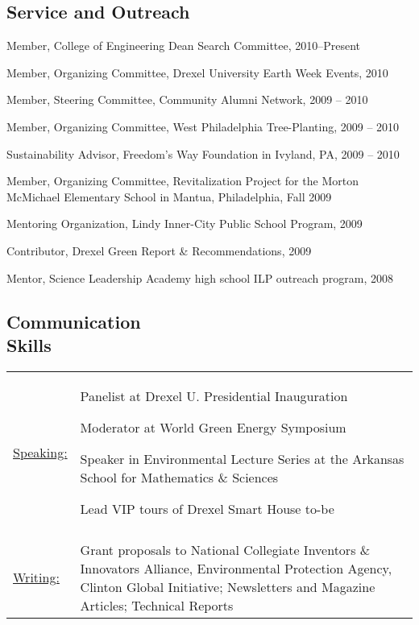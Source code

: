 \documentclass[margin]{res}
\begin{document}
\begin{resume}
\begin{educate}
\vspace{-3mm} \section{Service and Outreach}
	\begin{list}{}{\leftmargin=1em} \itemsep -2pt %
	\item Member, College of Engineering Dean Search Committee, 2010--Present
	\item Member, Organizing Committee, Drexel University Earth Week Events, 2010
	\item Member, Steering Committee, Community Alumni Network, 2009 -- 2010
	\item Member, Organizing Committee, West Philadelphia Tree-Planting, 2009 -- 2010
	\item Sustainability Advisor, Freedom's Way Foundation in Ivyland, PA, 2009 -- 2010
	\item Member, Organizing Committee, Revitalization Project for the Morton McMichael Elementary School in Mantua, Philadelphia, Fall 2009
	\item Mentoring Organization, Lindy Inner-City Public School Program, 2009
	\item Contributor, Drexel Green Report \& Recommendations, 2009
	\item Mentor, Science Leadership Academy high school ILP outreach program, 2008 
	\end{list}
\end{educate}

\begin{educate}
\section{Communication \\ Skills}
   \begin{tabular}{l p{3in}}
    \underline{Speaking:} & \vspace{-3.5mm}
    \begin{list}{}{\leftmargin=1em} \itemsep -2pt %
	\item Panelist at Drexel U. Presidential Inauguration
	\item Moderator at World Green Energy Symposium
	\item Speaker in Environmental Lecture Series at the Arkansas School for Mathematics \& Sciences
	\item Lead VIP tours of Drexel Smart House to-be
	\end{list} \\\\
     \underline{Writing:} & Grant proposals to National Collegiate Inventors \& Innovators Alliance, Environmental Protection Agency, Clinton Global Initiative; Newsletters and Magazine Articles; Technical Reports 
 \end{tabular}
\end{educate}
 

\end{resume}
\end{document}
